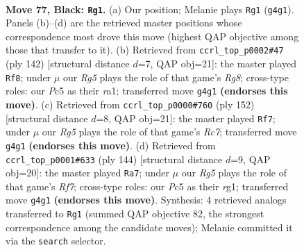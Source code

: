 \documentclass[11pt]{article}
\begin{document}
\clearpage

\begin{figure}[p]\centering
\begin{subfigure}{0.46\textwidth}\centering
\resizebox{\linewidth}{!}{%
\newchessgame
\chessboard[
  setfen={8/4k3/8/2pp4/p5r1/5K2/8/8 b - - 11 77},
  showmover=false,
  pgfstyle=straightmove, color=movearrow, markmove={g4-g1}
]}
\caption{}
\end{subfigure}\hfill
\begin{subfigure}{0.46\textwidth}\centering
\resizebox{\linewidth}{!}{%
\newchessgame
\chessboard[
  setfen={6R1/7k/5p2/8/6P1/4K3/8/r7 w - - 18 72},
  showmover=false,
  pgfstyle=straightmove, color=movearrow, markmove={g8-f8}
]}
\caption{}
\end{subfigure}
\\[4pt]
\begin{subfigure}{0.46\textwidth}\centering
\resizebox{\linewidth}{!}{%
\newchessgame
\chessboard[
  setfen={8/P1R5/3k4/5p2/5P2/r7/6K1/8 w - - 13 77},
  showmover=false,
  pgfstyle=straightmove, color=movearrow, markmove={c7-f7}
]}
\caption{}
\end{subfigure}\hfill
\begin{subfigure}{0.46\textwidth}\centering
\resizebox{\linewidth}{!}{%
\newchessgame
\chessboard[
  setfen={8/5R2/4k3/8/4pP2/8/3K4/6r1 w - - 26 73},
  showmover=false,
  pgfstyle=straightmove, color=movearrow, markmove={f7-a7}
]}
\caption{}
\end{subfigure}
\caption{\textbf{Move 77, Black: \texttt{Rg1}.} (a) Our position; Melanie plays \texttt{Rg1} (\texttt{g4g1}). Panels (b)--(d) are the retrieved master positions whose correspondence most drove this move (highest QAP objective among those that transfer to it). (b) Retrieved from \texttt{ccrl\_top\_p0002\#47} (ply 142) [structural distance $d$=7, QAP obj=21]: the master played \texttt{Rf8}; under $\mu$ our \emph{Rg5} plays the role of that game's \emph{Rg8}; cross-type roles: our \emph{P}c5 as their \emph{r}a1; transferred move \texttt{g4g1} \textbf{(endorses this move)}. (c) Retrieved from \texttt{ccrl\_top\_p0000\#760} (ply 152) [structural distance $d$=8, QAP obj=21]: the master played \texttt{Rf7}; under $\mu$ our \emph{Rg5} plays the role of that game's \emph{Rc7}; transferred move \texttt{g4g1} \textbf{(endorses this move)}. (d) Retrieved from \texttt{ccrl\_top\_p0001\#633} (ply 144) [structural distance $d$=9, QAP obj=20]: the master played \texttt{Ra7}; under $\mu$ our \emph{Rg5} plays the role of that game's \emph{Rf7}; cross-type roles: our \emph{P}c5 as their \emph{r}g1; transferred move \texttt{g4g1} \textbf{(endorses this move)}. Synthesis: 4 retrieved analogs transferred to \texttt{Rg1} (summed QAP objective 82, the strongest correspondence among the candidate moves); Melanie committed it via the \texttt{search} selector.}
\label{fig:thought-m153}
\end{figure}
\end{document}
